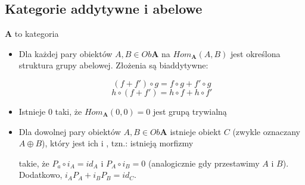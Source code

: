 \subsection{Kategorie addytywne i abelowe}

\begin{definition}
   $\mathbf{A}$ to kategoria
  \begin{itemize}
    \item Dla każdej pary obiektów $A,B\in Ob\mathbf{A}$ na $Hom_{\mathbf{A}}(A, B)$ jest określona struktura grupy abelowej. Złożenia są biaddytywne:
      \begin{center}\end{center}
      $$(f+f')\circ g=f\circ g+f'\circ g$$
      $$h\circ(f+f')=h\circ f+h\circ f'$$
    \item Istnieje  $0$ taki, że $Hom_{\mathbf{A}}(0, 0)=0$ jest grupą trywialną
    \item Dla dowolnej pary obiektów $A, B\in Ob\mathbf{A}$ istnieje obiekt $C$ (zwykle oznaczany $A\oplus B$), który jest ich  i , tzn.: istnieją morfizmy
      \begin{center}\end{center}
      takie, że $P_a\circ i_A=id_A$ i $P_A\circ i_B=0$ (analogicznie gdy przestawimy $A$ i $B$). Dodatkowo, $i_AP_A+i_BP_B=id_C$.
  \end{itemize}
\end{definition}

